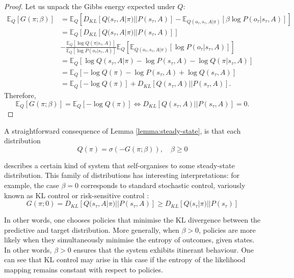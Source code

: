 \documentclass[review,12pt,authoryear]{elsarticle}
\begin{document}
\begin{proof}
Let us unpack the Gibbs energy expected under $Q$:
\begin{equation*}
    \begin{split}
        \mathbb E_Q[G(\pi; \beta)] &=\mathbb E_Q[D_{KL}[Q(s_\tau, A|\pi)||P(s_\tau,A)]-\mathbb E_{Q(o_\tau, s_\tau, A|\pi)} [\beta \log P(o_\tau |s_\tau, A)]] \\
        &= \mathbb E_Q[D_{KL}[Q(s_\tau, A|\pi)||P(s_\tau,A)]]\\
        &-\frac{\mathbb E_Q[\log Q(\pi|s_\tau,A)]}{\mathbb E_Q[\log P(o_\tau|s_\tau,A)]} \mathbb E_Q [\mathbb E_{Q(o_\tau, s_\tau, A|\pi)} [ \log P(o_\tau |s_\tau, A)]] \\
        &= \mathbb E_Q[\log Q(s_\tau, A|\pi)-\log P(s_\tau, A)-\log Q(\pi |s_\tau,A)] \\
        &= \mathbb E_Q[-\log Q(\pi)-\log P(s_\tau, A)+\log Q(s_\tau,A)] \\
        &= \mathbb E_Q[-\log Q(\pi)] +D_{KL}[Q(s_\tau,A)||P(s_\tau, A)].
    \end{split}
\end{equation*}
Therefore,
\begin{equation*}
    \mathbb E_Q[G(\pi; \beta)] = \mathbb E_Q[-\log Q(\pi)] \iff D_{KL}[Q(s_\tau,A)||P(s_\tau, A)]=0.
\end{equation*}
\end{proof}

A straightforward consequence of Lemma \ref{lemma:steady-state}, is that each distribution
\begin{equation}
    \label{eq:posterior_gibbs}
   Q(\pi) =\sigma(-G(\pi; \beta)),\quad \beta \geq 0
\end{equation}

describes a certain kind of system that self-organises to some steady-state distribution. This family of distributions has interesting interpretations: for example, the case $\beta=0$ corresponds to standard stochastic control, variously known as KL control or risk-sensitive control \citep{vandenbroekRiskSensitivePath2010}: 
\begin{equation*}
    G(\pi; 0) = D_{KL}[Q(s_\tau, A|\pi)||P(s_\tau, A)] \geq D_{KL}[Q(s_\tau |\pi)||P(s_\tau)]
\end{equation*}

In other words, one chooses policies that minimise the KL divergence between the predictive and target distribution. More generally, when $\beta >0$, policies are more likely when they simultaneously minimise the entropy of outcomes, given states. In other words, $\beta >0$ ensures that the system exhibits itinerant behaviour. One can see that KL control may arise in this case if the entropy of the likelihood mapping remains constant with respect to policies.
\end{document}
